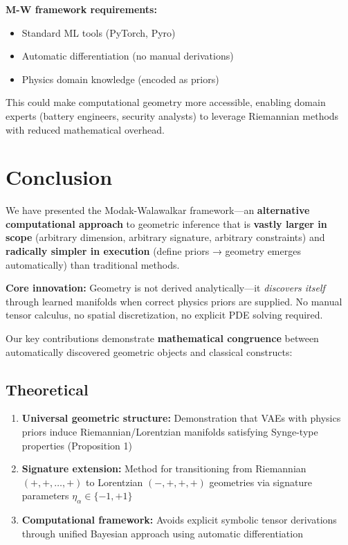 \documentclass[11pt,a4paper]{article}
\begin{document}
\textbf{M-W framework requirements:}
\begin{itemize}
\item Standard ML tools (PyTorch, Pyro)
\item Automatic differentiation (no manual derivations)
\item Physics domain knowledge (encoded as priors)
\end{itemize}

This could make computational geometry more accessible, enabling domain experts (battery engineers, security analysts) to leverage Riemannian methods with reduced mathematical overhead.

\section{Conclusion}

We have presented the Modak-Walawalkar framework—an \textbf{alternative computational approach} to geometric inference that is \textbf{vastly larger in scope} (arbitrary dimension, arbitrary signature, arbitrary constraints) and \textbf{radically simpler in execution} (define priors → geometry emerges automatically) than traditional methods.

\textbf{Core innovation:} Geometry is not derived analytically—it \emph{discovers itself} through learned manifolds when correct physics priors are supplied. No manual tensor calculus, no spatial discretization, no explicit PDE solving required.

Our key contributions demonstrate \textbf{mathematical congruence} between automatically discovered geometric objects and classical constructs:

\subsection{Theoretical}

\begin{enumerate}
\item \textbf{Universal geometric structure:} Demonstration that VAEs with physics priors induce Riemannian/Lorentzian manifolds satisfying Synge-type properties (Proposition 1)
\item \textbf{Signature extension:} Method for transitioning from Riemannian $(+,+,\ldots,+)$ to Lorentzian $(-,+,+,+)$ geometries via signature parameters $\eta_\alpha \in \{-1,+1\}$
\item \textbf{Computational framework:} Avoids explicit symbolic tensor derivations through unified Bayesian approach using automatic differentiation
\end{enumerate}
\end{document}
